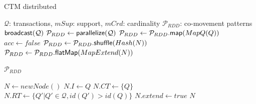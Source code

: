 \documentclass[preprint,12pt,authoryear]{elsarticle} %
\renewcommand{\sf}[1]{\textsf{\textup{#1}}}
\begin{document}
\begin{algorithm}[t]
\caption{CTM distributed}\label{alg:colossal-distributed}
\scriptsize\centering
\begin{algorithmic}[1]
\Require $\mathcal{Q}$: transactions, $mSup$: support, $mCrd$: cardinality
\Ensure $\mathcal{P}_{RDD}$: co-movement patterns
\State $\sf{broadcast}(\mathcal{Q})$                                            \label{alg:dist01}
\State $\mathcal{P}_{RDD} \gets \sf{parallelize}(\mathcal{Q})$                                   \label{alg:dist02}
    \State $\mathcal{P}_{RDD} \gets \mathcal{P}_{RDD}\sf{.map}(MapQ(Q))$                                                        \label{alg:dist03}
    \Do                        \label{alg:dist10}                                                                                     
        \State $acc \gets false$                                     \label{alg:dist11}
            \State $\mathcal{P}_{RDD} \gets \mathcal{P}_{RDD}\sf{.shuffle}(Hash(N))$                                \label{alg:dist14}
            \State $\mathcal{P}_{RDD} \gets \mathcal{P}_{RDD}\sf{.flatMap}(MapExtend(N))$
            \item[]                                     \label{alg:dist15}
                                                \label{alg:dist22}
    \State \Return $\mathcal{P}_{RDD}$
    \item[]
     
        \State $N \gets newNode()$ 
        \State $N.I \gets Q$                                                          \label{alg:dist04}
        \State $N.CT \gets \{ Q \}$  \label{alg:dist05}
        \State $N.RT \gets \{ Q' | Q' \in \mathcal{Q}, id(Q') > id(Q) \}$  \label{alg:dist06}
        \State $N.extend \gets true$                                      \label{alg:dist07}
        \State \Return $N$                                                   \label{alg:dist08}
    \EndFunction
    \item[]
     
          \label{alg:dist16}
        

\end{algorithmic}
\end{algorithm}
\end{document}

